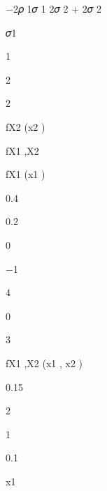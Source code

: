 \documentclass[a4paper,portrait,12pt]{article}
\begin{document}
\begin{flushleft}
$-$2𝜌 1𝜎 1 2𝜎 2 + 2𝜎 2
\end{flushleft}


\begin{flushleft}
𝜎1
\end{flushleft}


1


2


2





\begin{flushleft}
fX2 (x2 )
\end{flushleft}





\begin{flushleft}
fX1 ,X2
\end{flushleft}





\begin{flushleft}
fX1 (x1 )
\end{flushleft}


0.4


0.2


0


$-$1





4


0





3





\begin{flushleft}
fX1 ,X2 (x1 , x2 )
\end{flushleft}


0.15





2





1





0.1


\begin{flushleft}
x1
\end{flushleft}
\end{document}
